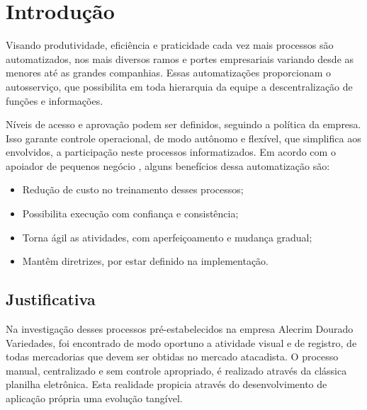 \documentclass[
	12pt,
	openright,
	oneside, %
	a4paper,
	chapter=TITLE,
	section=TITLE,
	english,
	brazil %
	]{abntex2-udesc}
\begin{document}

\ifdraft{}{
}

\ifdraft{}{
}

\tableofcontents*
\cleardoublepage

\textual
\pagestyle{simple}

\chapter{Introdução}

Visando produtividade, eficiência e praticidade cada vez mais processos são automatizados, nos mais diversos ramos e portes empresariais variando desde as menores até as grandes companhias. Essas automatizações proporcionam o autosserviço, que possibilita em toda hierarquia da equipe a descentralização de funções e informações.

Níveis de acesso e aprovação podem ser definidos, seguindo a política da empresa. Isso garante controle operacional, de modo autônomo e flexível, que simplifica aos envolvidos, a participação neste processos informatizados. Em acordo com o apoiador de pequenos negócio , alguns benefícios dessa automatização são:

\begin{itemize}
\item Redução de custo no treinamento desses processos;
\item Possibilita execução com confiança e consistência;
\item Torna ágil as atividades, com aperfeiçoamento e mudança gradual;
\item Mantêm diretrizes, por estar definido na implementação.
\end{itemize}

\section{Justificativa}

Na investigação desses processos pré-estabelecidos na empresa Alecrim Dourado Variedades, foi encontrado de modo oportuno a atividade visual e de registro, de todas mercadorias que devem ser obtidas no mercado atacadista. O processo manual, centralizado e sem controle apropriado, é realizado através da clássica planilha eletrônica. Esta realidade propicia através do desenvolvimento de aplicação própria uma evolução tangível.
\end{document}

